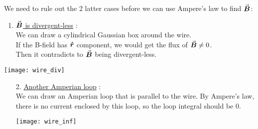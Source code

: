\documentclass[class=article, crop=false, 12pt]{standalone}
\begin{document}
\begin{example}
    We need to rule out the 2 latter cases before we can use Ampere's law to find $\va*{B}$:\\

    \begin{minipage}{0.8\linewidth}
        \begin{enumerate}
            \item \ul{$\va*{B}$ is divergent-less} : \\[1ex]
            We can draw a cylindrical Gaussian box around the wire.\\
            If the B-field has $\vu*{r}$ component,
            we would get the flux of $\va*{B} \neq 0$.\\
            Then it contradicts to $\va*{B}$ being divergent-less.
            
        \end{enumerate}
    \end{minipage}
    \hspace{0.05\textwidth}
    \begin{minipage}{0.1\linewidth}
        \centering
        \texttt{[image: wire\_div]}
    \end{minipage}
    
    \begin{enumerate}
        \item[2.] \ul{Another Amperian loop} : \\[1ex]
        We can draw an Amperian loop that is parallel to the wire.
        By Ampere's law, there is no current enclosed by this loop,
        so the loop integral should be $0$.

        \begin{center}
            \begin{minipage}{0.5\linewidth}
                \centering
                \texttt{[image: wire\_inf]}
            \end{minipage}
        \end{center}

\end{enumerate}
\end{example}
\end{document}
